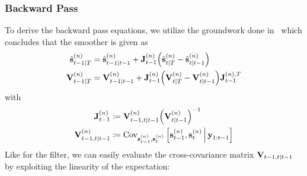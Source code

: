 	\subsubsection{Backward Pass}
		To derive the backward pass equations, we utilize the groundwork done in~\cite{deisenrothProbabilisticPerspectiveGaussian2011} which concludes that the smoother is given as
		\begin{align*}
			\hat{\boldsymbol{\mathrm{s}}}_{t - 1 \vert T}^{(n)} &= \hat{\boldsymbol{\mathrm{s}}}_{t - 1 \vert t - 1}^{(n)} + \boldsymbol{\mathrm{J}}_{t - 1}^{(n)} \Big(\hat{\boldsymbol{\mathrm{s}}}_{t \vert T}^{(n)} - \hat{\boldsymbol{\mathrm{s}}}_{t \vert t - 1}^{(n)}\Big) \\
			\boldsymbol{\mathrm{V}}_{t - 1 \vert T}^{(n)}       &= \boldsymbol{\mathrm{V}}_{t - 1 \vert t - 1}^{(n)} + \boldsymbol{\mathrm{J}}_{t - 1}^{(n)} \Big(\boldsymbol{\mathrm{V}}_{t \vert T}^{(n)} - \boldsymbol{\mathrm{V}}_{t \vert t - 1}^{(n)}\Big) \boldsymbol{\mathrm{J}}_{t - 1}^{(n), T}
		\end{align*}
		with
		\begin{align}
			\boldsymbol{\mathrm{J}}_{t - 1}^{(n)}                    &\coloneqq \boldsymbol{\mathrm{V}}_{t - 1, t \vert t - 1}^{(n)} \Big(\boldsymbol{\mathrm{V}}_{t \vert t - 1}^{(n)}\Big)^{-1}  \nonumber \\
			\boldsymbol{\mathrm{V}}_{t - 1, t \vert t - 1}^{(n)} &\coloneqq \operatorname{Cov}_{\boldsymbol{\mathrm{s}}_{t - 1}^{(n)}, \boldsymbol{\mathrm{s}}_t^{(n)}}\Big[\boldsymbol{\mathrm{s}}_{t - 1}^{(n)}, \boldsymbol{\mathrm{s}}_t^{(n)} \,\Big\vert\, \boldsymbol{\mathrm{y}}_{1:t - 1}\Big]  \label{eq:smootherPriorCrossCov}
		\end{align}
		Like for the filter, we can easily evaluate the cross-covariance matrix \( \boldsymbol{\mathrm{V}}_{t - 1, t \vert t - 1} \) by exploiting the linearity of the expectation:
